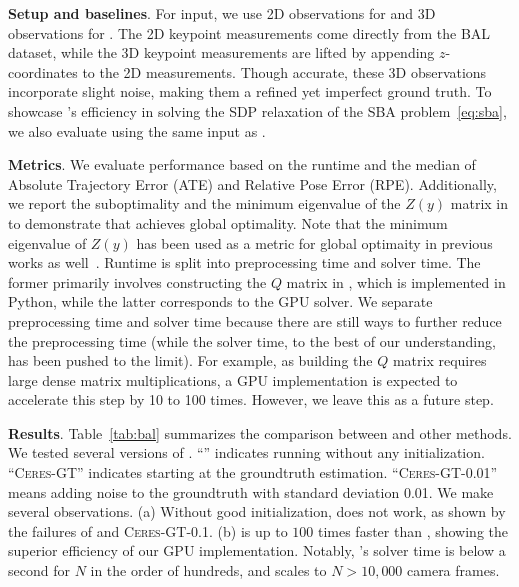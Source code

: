 \textbf{Setup and baselines}.
For input, we use 2D observations for \ceres and 3D observations for \nameshort. The 2D keypoint measurements come directly from the BAL dataset, while the 3D keypoint measurements are lifted by appending $z$-coordinates to the 2D measurements. Though accurate, these 3D observations incorporate slight noise, making them a refined yet imperfect ground truth. To showcase \nameshort's efficiency in solving the SDP relaxation of the SBA problem~\eqref{eq:sba}, we also evaluate \manopt using the same input as \nameshort.




\textbf{Metrics}.
We evaluate performance based on the runtime and the median of Absolute Trajectory Error (ATE) and Relative Pose Error (RPE). Additionally, we report the suboptimality and the minimum eigenvalue of the $Z(y)$ matrix in  to demonstrate that \nameshort achieves global optimality. Note that the minimum eigenvalue of $Z(y)$ has been used as a metric for global optimaity in previous works as well~\cite{carlone2015lagrangian}. Runtime is split into preprocessing time and solver time. The former primarily involves constructing the $Q$ matrix in , which is implemented in Python, while the latter corresponds to the GPU solver. We separate preprocessing time and solver time because there are still ways to further reduce the preprocessing time (while the solver time, to the best of our understanding, has been pushed to the limit). For example, as building the $Q$ matrix requires large dense matrix multiplications, a GPU implementation is expected to accelerate this step by 10 to 100 times. However, we leave this as a future step.

\textbf{Results}.
Table~\ref{tab:bal} summarizes the comparison between \nameshort and other methods. We tested several versions of \ceres. ``\ceres'' indicates running \ceres without any initialization. ``\textsc{Ceres-GT}'' indicates starting \ceres at the groundtruth estimation. ``\textsc{Ceres-GT-0.01}'' means adding noise to the groundtruth with standard deviation 0.01. We make several observations. (a) Without good initialization, \ceres does not work, as shown by the failures of \ceres and \textsc{Ceres-GT-0.1}. (b) \nameshort is up to $100$ times faster than \manopt, showing the superior efficiency of our GPU implementation. Notably, \nameshort's solver time is below a second for $N$ in the order of hundreds, and \nameshort scales to $N > 10,000$ camera frames. 

